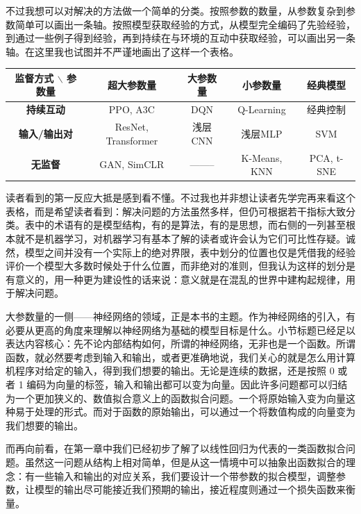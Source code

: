 不过我想可以对解决的方法做一个简单的分类。按照参数的数量，从参数复杂到参数简单可以画出一条轴。按照模型获取经验的方式，从模型完全编码了先验经验，到通过一些例子得到经验，再到持续在与环境的互动中获取经验，可以画出另一条轴。在这里我也试图并不严谨地画出了这样一个表格。
\begin{table}[H]
    \centering
    \begin{tabular}{c|cccc}
        \toprule
        \textbf{监督方式 $\backslash$ 参数量} & \textbf{超大参数量}      & \textbf{大参数量} & \textbf{小参数量} & \textbf{经典模型} \\
        \midrule
        \textbf{持续互动}                  & PPO, A3C            & DQN           & Q-Learning    & 经典控制          \\
        \textbf{输入/输出对}                & ResNet, Transformer & 浅层CNN         & 浅层MLP         & SVM           \\
        \textbf{无监督}                   & GAN, SimCLR         & --------      & K-Means, KNN  & PCA, t-SNE    \\
        \bottomrule
    \end{tabular}
\end{table}
读者看到的第一反应大抵是感到看不懂。不过我也并非想让读者先学完再来看这个表格，而是希望读者看到：解决问题的方法虽然多样，但仍可根据若干指标大致分类。表中的术语有的是模型结构，有的是算法，有的是思想，而右侧的一列甚至根本就不是机器学习，对机器学习有基本了解的读者或许会认为它们可比性存疑。诚然，模型之间并没有一个实际上的绝对界限，表中划分的位置也仅是凭借我的经验评价一个模型大多数时候处于什么位置，而非绝对的准则，但我认为这样的划分是有意义的，用一种更为建设性的话来说：意义就是在混乱的世界中建构起规律，用于解决问题。

大参数量的一侧——神经网络的领域，正是本书的主题。作为神经网络的引入，有必要从更高的角度来理解以神经网络为基础的模型目标是什么。小节标题已经足以表达内容核心：先不论内部结构如何，所谓的神经网络，无非也是一个函数。所谓函数，就必然要考虑到输入和输出，或者更准确地说，我们关心的就是怎么用计算机程序对给定的输入，得到我们想要的输出。无论是连续的数据，还是按照 0 或者 1 编码为向量的标签，输入和输出都可以变为向量。因此许多问题都可以归结为一个更加狭义的、数值拟合意义上的函数拟合问题。一个将原始输入变为向量这种易于处理的形式。而对于函数的原始输出，可以通过一个将数值构成的向量变为我们想要的输出。

而再向前看，在第一章中我们已经初步了解了以线性回归为代表的一类函数拟合问题。虽然这一问题从结构上相对简单，但是从这一情境中可以抽象出函数拟合的理念：有一些输入和输出的对应关系，我们要设计一个带参数的拟合模型，调整参数，让模型的输出尽可能接近我们预期的输出，接近程度则通过一个损失函数来衡量。

